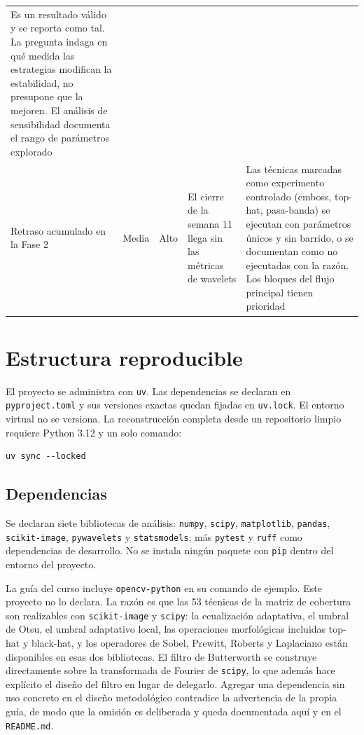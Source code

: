 \documentclass[12pt,a4paper]{article}
\begin{document}
\begin{table}[H]
\begin{tabular}{@{}p{2.5cm}cp{1.1cm}p{3.2cm}p{4.5cm}@{}}
Es un resultado válido y se reporta como tal. La pregunta indaga en qué medida las estrategias modifican la estabilidad, no presupone que la mejoren. El análisis de sensibilidad documenta el rango de parámetros explorado \\
\addlinespace
Retraso acumulado en la Fase 2 &
Media & Alto &
El cierre de la semana 11 llega sin las métricas de wavelets &
Las técnicas marcadas como experimento controlado (emboss, top-hat, pasa-banda) se ejecutan con parámetros únicos y sin barrido, o se documentan como no ejecutadas con la razón. Los bloques del flujo principal tienen prioridad \\
\bottomrule
\end{tabular}
\end{table}



\section{Estructura reproducible}

El proyecto se administra con \texttt{uv}. Las dependencias se declaran en
\texttt{pyproject.toml} y sus versiones exactas quedan fijadas en
\texttt{uv.lock}. El entorno virtual no se versiona. La reconstrucción completa
desde un repositorio limpio requiere Python 3.12 y un solo comando:

\begin{verbatim}
uv sync --locked
\end{verbatim}

\subsection{Dependencias}

Se declaran siete bibliotecas de análisis: \texttt{numpy}, \texttt{scipy},
\texttt{matplotlib}, \texttt{pandas}, \texttt{scikit-image}, \texttt{pywavelets}
y \texttt{statsmodels}; más \texttt{pytest} y \texttt{ruff} como dependencias de
desarrollo. No se instala ningún paquete con \texttt{pip} dentro del entorno del
proyecto.

La guía del curso incluye \texttt{opencv-python} en su comando de ejemplo. Este
proyecto no lo declara. La razón es que las 53 técnicas de la matriz de
cobertura son realizables con \texttt{scikit-image} y \texttt{scipy}: la
ecualización adaptativa, el umbral de Otsu, el umbral adaptativo local, las
operaciones morfológicas incluidas top-hat y black-hat, y los operadores de
Sobel, Prewitt, Roberts y Laplaciano están disponibles en esas dos bibliotecas.
El filtro de Butterworth se construye directamente sobre la transformada de
Fourier de \texttt{scipy}, lo que además hace explícito el diseño del filtro en
lugar de delegarlo. Agregar una dependencia sin uso concreto en el diseño
metodológico contradice la advertencia de la propia guía, de modo que la omisión
es deliberada y queda documentada aquí y en el \texttt{README.md}.
\end{document}
